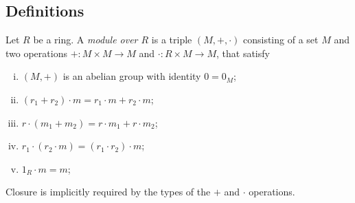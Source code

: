 \subsection{Definitions}
\begin{definition}
	Let \( R \) be a ring.
	A \textit{module over \( R \)} is a triple \( (M, +, \cdot) \) consisting of a set \( M \) and two operations \( + \colon M \times M \to M \) and \( \cdot \colon R \times M \to M \), that satisfy
	\begin{enumerate}[(i)]
		\item \( (M, +) \) is an abelian group with identity \( 0 = 0_M \);
		\item \( (r_1 + r_2) \cdot m = r_1 \cdot m + r_2 \cdot m \);
		\item \( r \cdot (m_1 + m_2) = r \cdot m_1 + r \cdot m_2 \);
		\item \( r_1 \cdot (r_2 \cdot m) = (r_1 \cdot r_2) \cdot m \);
		\item \( 1_R \cdot m = m \);
	\end{enumerate}
\end{definition}
\begin{remark}
	Closure is implicitly required by the types of the \( + \) and \( \cdot \) operations.
\end{remark}
